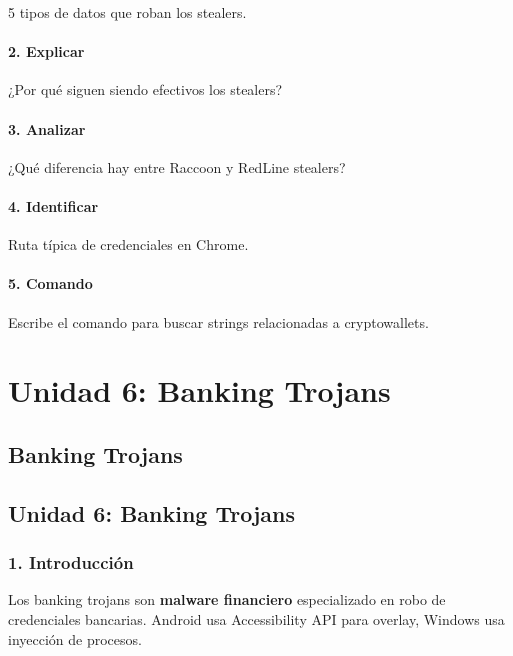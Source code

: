 \documentclass[
  letterpaper,
]{report}
\begin{document}
5 tipos de datos que roban los stealers.

\subsection{2. Explicar}\label{explicar}

¿Por qué siguen siendo efectivos los stealers?

\subsection{3. Analizar}\label{analizar}

¿Qué diferencia hay entre Raccoon y RedLine stealers?

\subsection{4. Identificar}\label{identificar}

Ruta típica de credenciales en Chrome.

\subsection{5. Comando}\label{comando-3}

Escribe el comando para buscar strings relacionadas a cryptowallets.

\part{Unidad 6: Banking Trojans}

\chapter{Banking Trojans}\label{banking-trojans}

\chapter{Unidad 6: Banking Trojans}\label{unidad-6-banking-trojans-1}

\section{1. Introducción}\label{introducciuxf3n-5}

Los banking trojans son \textbf{malware financiero} especializado en
robo de credenciales bancarias. Android usa Accessibility API para
overlay, Windows usa inyección de procesos.
\end{document}
